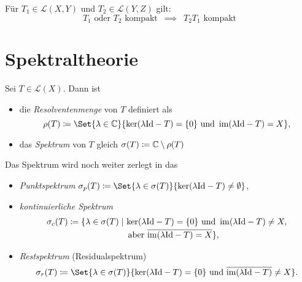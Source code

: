 \documentclass{cheat-sheet}
\newcommand{\LSO}{\mathcal{L}} %
\begin{document}
\begin{samepage}

\begin{lem}
  Für $T_1 \in \LSO(X, Y)$ und $T_2 \in \LSO(Y, Z)$ gilt:
  \[
    \text{$T_1$ oder $T_2$ kompakt}
    \enspace \implies \enspace
    \text{$T_2 T_1$ kompakt}
  \]
\end{lem}

\iffalse
\begin{bspe}
  \begin{itemize}
    \item Sei $\Omega \opn \R^n$, beschränkt mit $\mathcal{C}^{0,1}$-Rand. Seien $m_1 > m_2 \in \N$ und $1 \leq p_1, p_2 < \infty$ sowie $m_1 - \tfrac{n}{p_1} > m_2 - \tfrac{n}{p_2}$. Dann ist die Einbettung $\Id : W^{m_1,p_1}(\Omega) \to W^{m_2,p_2}(\Omega)$ stetig und kompakt.
    \item Viele Integraloperatoren, vgl. z.\,B. ÜA24
  \end{itemize}
\end{bspe}
\fi

\section{Spektraltheorie}

\end{samepage}


\begin{defn}
  Sei $T \in \LSO(X)$. Dann ist
  \begin{itemize}
    \item die \emph{Resolventenmenge} von $T$ definiert als
    \[ \rho(T) \coloneqq \Set{ \lambda \in \C }{ \ker (\lambda \Id - T) = \{ 0 \} \text{ und } \im (\lambda \Id - T) = X }, \]
    \item das \emph{Spektrum} von $T$ gleich $\sigma(T) \coloneqq \mathbb{C} \setminus \rho(T)$
  \end{itemize}
  Das Spektrum wird noch weiter zerlegt in das
  \begin{itemize}
    \item \emph{Punktspektrum} $\sigma_p(T) \coloneqq \Set{ \lambda \in \sigma(T) }{ \ker(\lambda \Id - T) \not= \emptyset }$,
    \item \emph{kontinuierliche Spektrum}
    \begin{align*}
      \sigma_c(T) \coloneqq \{ \lambda \in \sigma(T) \mid\, &\ker(\lambda \mathrm{Id} - T) = \{ 0 \} \text{ und } \mathop{\mathrm{im}} (\lambda \mathrm{Id} - T) \not= X,\\[-2pt]
      &\text{ aber } \overline{\mathop{\mathrm{im}} (\lambda \mathrm{Id} - T) = X } \},
    \end{align*}
    \item \emph{Restspektrum} (Residualspektrum)
    \[ \sigma_r(T) \coloneqq \Set{ \lambda \in \sigma(T) }{ \ker(\lambda \Id - T) = \{ 0 \} \text{ und } \overline{\im(\lambda \Id - T)} \not= X }. \]
  \end{itemize}
\end{defn}
\end{document}
